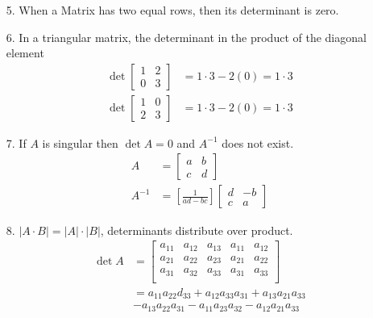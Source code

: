 \documentclass[main.tex]{subfiles}
\begin{document}
\begin{enumerate}
    \item[5.] When a Matrix has two equal rows, then its determinant is zero.
    
    \item[6.] In a triangular matrix, the determinant in the product of the diagonal element
    $$
    \begin{aligned}
    \operatorname{det} \left[\begin{array}{ll}
    1 & 2 \\
    0 & 3
    \end{array}\right] & = 1 \cdot 3 - 2(0) = 1 \cdot 3\\ 
    \operatorname{det} \left[\begin{array}{ll}
    1 & 0 \\
    2 & 3
    \end{array}\right] & = 1 \cdot 3 - 2(0) = 1 \cdot 3
    \end{aligned}
    $$
    
    \item[7.] If $A$ is singular then $\operatorname{det} A=0$ and $A^{-1}$ does not exist.
    $$
    \begin{aligned}
    A&=\left[\begin{array}{ll}
    a & b \\
    c & d
    \end{array}\right] \\
    A^{-1}&=\left[\frac{1}{a d-b c}\right]\left[\begin{array}{cc}
    d & -b \\
    c & a
    \end{array}\right]
    \end{aligned}
    $$

    \item[8.] $|A \cdot B|=|A| \cdot|B|$, determinants distribute over product.
    $$
    \begin{aligned}
    \operatorname{det}A&=\left[\begin{array}{lll|ll}
    a_{11} & a_{12} & a_{13} & a_{11} & a_{12} \\
    a_{21} & a_{22} & a_{23} & a_{21} & a_{22} \\
    a_{31} & a_{32} & a_{33} & a_{31} & a_{33} \\
    \end{array}\right] \\
    & = a_{11} a_{22} d_{33}
    +a_{12} a_{33} a_{31} 
    +a_{13} a_{21} a_{33} \\
    & -a_{13} a_{22} a_{31}
    -a_{11} a_{23} a_{32}
    -a_{12} a_{21} a_{33}
    \end{aligned}
    $$
    
\end{enumerate}
\end{document}
